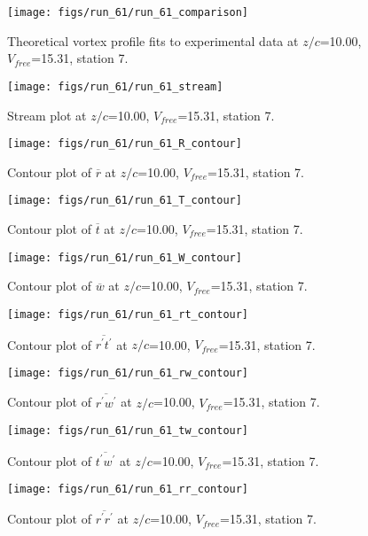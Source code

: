\begin{figure}[H]
\centering
\texttt{[image: figs/run\_61/run\_61\_comparison]}
\caption{Theoretical vortex profile fits to experimental data at $z/c$=10.00, $V_{free}$=15.31, station 7.}
\end{figure}


\begin{figure}[H]
\centering
\texttt{[image: figs/run\_61/run\_61\_stream]}
\caption{Stream plot at $z/c$=10.00, $V_{free}$=15.31, station 7.}
\end{figure}


\begin{figure}[H]
\centering
\texttt{[image: figs/run\_61/run\_61\_R\_contour]}
\caption{Contour plot of $\overline{r}$ at $z/c$=10.00, $V_{free}$=15.31, station 7.}
\end{figure}


\begin{figure}[H]
\centering
\texttt{[image: figs/run\_61/run\_61\_T\_contour]}
\caption{Contour plot of $\overline{t}$ at $z/c$=10.00, $V_{free}$=15.31, station 7.}
\end{figure}


\begin{figure}[H]
\centering
\texttt{[image: figs/run\_61/run\_61\_W\_contour]}
\caption{Contour plot of $\overline{w}$ at $z/c$=10.00, $V_{free}$=15.31, station 7.}
\end{figure}


\begin{figure}[H]
\centering
\texttt{[image: figs/run\_61/run\_61\_rt\_contour]}
\caption{Contour plot of $\overline{r^\prime t^\prime}$ at $z/c$=10.00, $V_{free}$=15.31, station 7.}
\end{figure}


\begin{figure}[H]
\centering
\texttt{[image: figs/run\_61/run\_61\_rw\_contour]}
\caption{Contour plot of $\overline{r^\prime w^\prime}$ at $z/c$=10.00, $V_{free}$=15.31, station 7.}
\end{figure}


\begin{figure}[H]
\centering
\texttt{[image: figs/run\_61/run\_61\_tw\_contour]}
\caption{Contour plot of $\overline{t^\prime w^\prime}$ at $z/c$=10.00, $V_{free}$=15.31, station 7.}
\end{figure}


\begin{figure}[H]
\centering
\texttt{[image: figs/run\_61/run\_61\_rr\_contour]}
\caption{Contour plot of $\overline{r^\prime r^\prime}$ at $z/c$=10.00, $V_{free}$=15.31, station 7.}
\end{figure}


